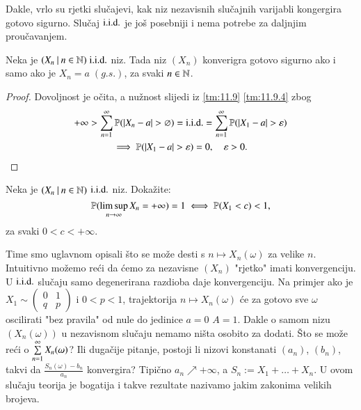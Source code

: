 Dakle, vrlo su rjetki slu\v cajevi, kak niz nezavisnih slu\v cajnih varijabli kongergira gotovo sigurno.
Slu\v caj $\mathrm{i.i.d.}$ je jo\v s posebniji i nema potrebe za daljnjim prou\v cavanjem.

\begin{kor} \label{kor:11.10}
    Neka je $({X_n} \: | \: {n \in \mathbb{N}}) \; \mathrm{i.i.d.}$ niz.
    Tada niz $(X_n)$ konverigra gotovo sigurno ako i samo ako je $X_n = a \; (g.s.)$, za svaki $n \in \mathbb{N}$.
\end{kor}

\begin{proof}
    Dovoljnost je o\v cita, a nu\v znost slijedi iz \ref{tm:11.9} \ref{tm:11.9.4} zbog
    \begin{equation*}
        \begin{gathered}
            +\infty > \suma{n = 1}{\infty} \vjeroj{|X_n - a|>\varnothing} = \iid = \suma{n = 1}{\infty} \vjeroj{|X_1 - a|> \varepsilon}\\
            \implies \vjeroj{|X_1 - a| > \varepsilon} = 0, \quad \varepsilon > 0.
        \end{gathered}
    \end{equation*}
\end{proof}

\begin{zad} \label{zad:11.11}
    Neka je $({X_n} \: | \: {n \in \mathbb{N}})$ $\mathrm{i.i.d.}$ niz.
    Doka\v zite:
    \begin{equation*}
        \mathbb{P}({\limsup\limits_{n \to \infty} X_n  = +\infty}) = 1 \iff \mathbb{P}({X_1 < c}) < 1,
    \end{equation*}
    za svaki $0 < c < +\infty$.
\end{zad}

\begin{nap} \label{nap:11.12}
    Time smo uglavnom opisali \v sto se mo\v ze desti s $n \mapsto X_n(\omega)$ za velike $n$.
    Intuitivno mo\v zemo re\' ci da \' cemo za nezavisne $(X_n)$ "rjetko" imati konvergenciju.
    U $\mathrm{i.i.d.}$ slu\v caju samo degenerirana razdioba daje konvergenciju.
    Na primjer ako je $X_1 \sim \begin{pmatrix} 0 & 1\\ q & p \end{pmatrix}$ i $0 < p < 1$, trajektorija $n \mapsto X_n(\omega)$ \' ce za gotovo sve $\omega$ oscilirati "bez pravila" od nule do jedinice $a = 0$ $A = 1$.
    Dakle o samom nizu $(X_n (\omega))$ u nezavisnom slu\v caju nemamo ni\v sta osobito za dodati.
    \v Sto se mo\v ze re\' ci o $\sum\limits_{n = 1}^{\infty} X_n (\omega)$?
    Ili duga\v cije pitanje, postoji li nizovi konstanati $(a_n)$, $(b_n)$, takvi da $\frac{S_n(\omega) - b_n}{a_n}$ konvergira?
    Tipi\v cno $a_n \nearrow +\infty$, a $S_n := X_1 + \ldots + X_n$.
    U ovom slu\v caju teorija je bogatija i takve rezultate nazivamo jakim zakonima velikih brojeva.
\end{nap}

